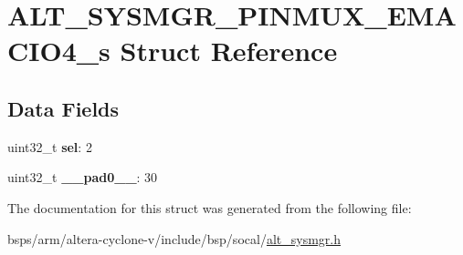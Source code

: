 \hypertarget{structALT__SYSMGR__PINMUX__EMACIO4__s}{}\section{A\+L\+T\+\_\+\+S\+Y\+S\+M\+G\+R\+\_\+\+P\+I\+N\+M\+U\+X\+\_\+\+E\+M\+A\+C\+I\+O4\+\_\+s Struct Reference}
\label{structALT__SYSMGR__PINMUX__EMACIO4__s}
\subsection*{Data Fields}
\begin{DoxyCompactItemize}
\item 
\mbox{\label{structALT__SYSMGR__PINMUX__EMACIO4__s_aa3c4d1fc50d37f07ced72c6a98a71999}} 
uint32\+\_\+t {\bfseries sel}\+: 2
\item 
\mbox{\label{structALT__SYSMGR__PINMUX__EMACIO4__s_a110d622823309978a7c8cefd4c27bd55}} 
uint32\+\_\+t {\bfseries \+\_\+\+\_\+pad0\+\_\+\+\_\+}\+: 30
\end{DoxyCompactItemize}


The documentation for this struct was generated from the following file\+:\begin{DoxyCompactItemize}
\item 
bsps/arm/altera-\/cyclone-\/v/include/bsp/socal/\mbox{\hyperlink{alt__sysmgr_8h}{alt\+\_\+sysmgr.\+h}}\end{DoxyCompactItemize}
